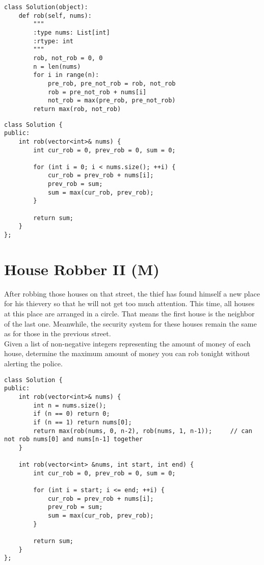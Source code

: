 \begin{lstlisting}
class Solution(object):
    def rob(self, nums):
        """
        :type nums: List[int]
        :rtype: int
        """
        rob, not_rob = 0, 0
        n = len(nums)
        for i in range(n):
            pre_rob, pre_not_rob = rob, not_rob
            rob = pre_not_rob + nums[i]
            not_rob = max(pre_rob, pre_not_rob)
        return max(rob, not_rob)
\end{lstlisting}

\begin{lstlisting}
class Solution {
public:
    int rob(vector<int>& nums) {
        int cur_rob = 0, prev_rob = 0, sum = 0;
        
        for (int i = 0; i < nums.size(); ++i) {
            cur_rob = prev_rob + nums[i];
            prev_rob = sum;
            sum = max(cur_rob, prev_rob);
        }
        
        return sum;
    }
};
\end{lstlisting}


\section{House Robber II (M)}
After robbing those houses on that street, the thief has found himself a new place for his thievery so that he will not get too much attention. This time, all houses at this place are arranged in a circle. That means the first house is the neighbor of the last one. Meanwhile, the security system for these houses remain the same as for those in the previous street. \\

Given a list of non-negative integers representing the amount of money of each house, determine the maximum amount of money you can rob tonight without alerting the police.\\

\begin{lstlisting}
class Solution {
public:
    int rob(vector<int>& nums) {
        int n = nums.size();
        if (n == 0) return 0;
        if (n == 1) return nums[0];
        return max(rob(nums, 0, n-2), rob(nums, 1, n-1));     // can not rob nums[0] and nums[n-1] together
    }
    
    int rob(vector<int> &nums, int start, int end) {
        int cur_rob = 0, prev_rob = 0, sum = 0;
        
        for (int i = start; i <= end; ++i) {
            cur_rob = prev_rob + nums[i];
            prev_rob = sum;
            sum = max(cur_rob, prev_rob);
        }
        
        return sum;
    }
};
\end{lstlisting}


